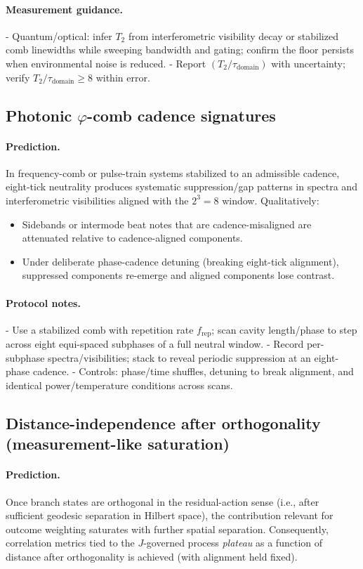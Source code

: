 \documentclass[12pt,a4paper]{article}
\begin{document}
\paragraph{Measurement guidance.}
- Quantum/optical: infer $T_{2}$ from interferometric visibility decay or stabilized comb linewidths while sweeping bandwidth and gating; confirm the floor persists when environmental noise is reduced.
- Report $(T_{2}/\tau_{\mathrm{domain}})$ with uncertainty; verify $T_{2}/\tau_{\mathrm{domain}}\ge 8$ within error.

\subsection{Photonic $\varphi$-comb cadence signatures}
\paragraph{Prediction.}
In frequency-comb or pulse-train systems stabilized to an admissible cadence, eight-tick neutrality produces systematic suppression/gap patterns in spectra and interferometric visibilities aligned with the $2^{3}=8$ window. Qualitatively:
\begin{itemize}
  \item Sidebands or intermode beat notes that are cadence-misaligned are attenuated relative to cadence-aligned components.
  \item Under deliberate phase-cadence detuning (breaking eight-tick alignment), suppressed components re-emerge and aligned components lose contrast.
\end{itemize}

\paragraph{Protocol notes.}
- Use a stabilized comb with repetition rate $f_{\mathrm{rep}}$; scan cavity length/phase to step across eight equi-spaced subphases of a full neutral window.
- Record per-subphase spectra/visibilities; stack to reveal periodic suppression at an eight-phase cadence.
- Controls: phase/time shuffles, detuning to break alignment, and identical power/temperature conditions across scans.

\subsection{Distance-independence after orthogonality (measurement-like saturation)}
\paragraph{Prediction.}
Once branch states are orthogonal in the residual-action sense (i.e., after sufficient geodesic separation in Hilbert space), the contribution relevant for outcome weighting saturates with further spatial separation. Consequently, correlation metrics tied to the $J$-governed process \emph{plateau} as a function of distance after orthogonality is achieved (with alignment held fixed).
\end{document}
